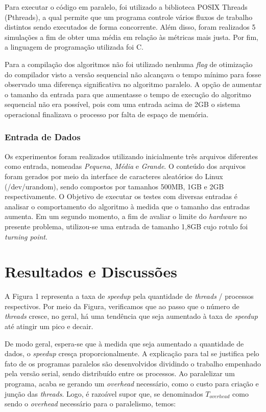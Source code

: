 \documentclass[letterpaper, 10 pt, conference]{ieeeconf}  %
\begin{document}
Para executar o código em paralelo, foi utilizado a biblioteca POSIX Threads (Pthreads), a qual permite que um programa controle vários fluxos de trabalho distintos sendo executados de forma concorrente. Além disso, foram realizados 5 simulações a fim de obter uma média em relação às métricas mais justa. Por fim, a linguagem de programação utilizada foi C.

Para a compilação dos algoritmos não foi utilizado nenhuma \textit{flag} de otimização do compilador visto a versão sequencial não alcançava o tempo mínimo para fosse observado uma diferença significativa no algoritmo paralelo. A opção de aumentar o tamanho da entrada para que aumentasse o tempo de execução do algoritmo sequencial não era possível, pois com uma entrada acima de 2GB o sistema operacional finalizava o processo por falta de espaço de memória. 

\subsubsection{Entrada de Dados}
Os experimentos foram realizados utilizando inicialmente três arquivos diferentes como entrada, nomeadas \textit{Pequena}, \textit{Média} e \textit{Grande}. O conteúdo dos arquivos foram gerados por meio da interface de caracteres aleatórios do Linux (/dev/urandom), sendo compostos por tamanhos 500MB, 1GB e 2GB respectivamente. O Objetivo de executar os testes com diversas entradas é analisar o comportamento do algoritmo à medida que o tamanho das entradas aumenta. Em um segundo momento, a fim de avaliar o limite do \textit{hardware} no presente problema, utilizou-se uma entrada de tamanho 1,8GB cujo rotulo foi \textit{turning point}.

\section{Resultados e Discussões}


A Figura 1 representa a taxa de \textit{speedup} pela quantidade de \textit{threads} / processos respectivos. Por meio da Figura, verificamos que ao passo que o número de \textit{threads} cresce, no geral, há uma tendência que seja aumentado à taxa de \textit{speedup} até atingir um pico e decair. 

De modo geral, espera-se que à medida que seja aumentado a quantidade de dados, o \textit{speedup} cresça proporcionalmente. A explicação para tal se justifica pelo fato de os programas paralelos são desenvolvidos dividindo o trabalho empenhado pela versão serial, sendo distribuído entre os processos. Ao paralelizar um programa, acaba se gerando um \textit{overhead} necessário, como o custo para criação e junção das \textit{threads}. Logo, é razoável supor que, se denominados $T_{overhead}$ como sendo o \textit{overhead} necessário para o paralelismo, temos:
\end{document}
